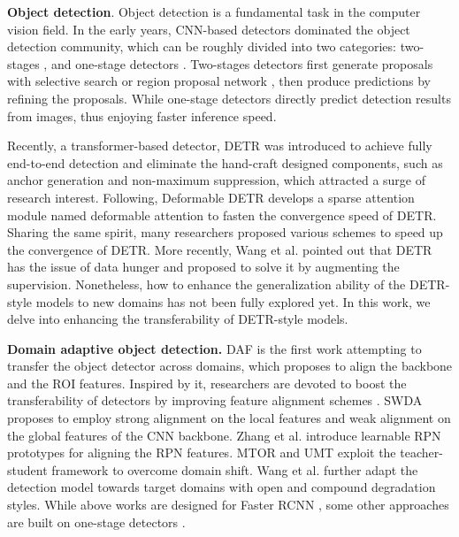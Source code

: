 \documentclass[sigconf]{acmart}
\begin{document}
\textbf{Object detection}.
Object detection is a fundamental task in the computer vision field. In the early years, CNN-based detectors dominated the object detection community, which can be roughly divided into two categories: two-stages \cite{faster-rcnn}, and one-stage detectors \cite{yolo,ssd}. Two-stages detectors first generate proposals with selective search \cite{fast_rcnn} or region proposal network \cite{faster-rcnn}, then produce predictions by refining the proposals. While one-stage detectors directly predict detection results from images, thus enjoying faster inference speed.

Recently, a transformer-based detector, DETR \cite{detr} was introduced to achieve fully end-to-end detection and eliminate the hand-craft designed components, such as anchor generation and non-maximum suppression, which attracted a surge of research interest. Following, Deformable DETR \cite{zhu2020deformable} develops a sparse attention module named deformable attention to fasten the convergence speed of DETR. Sharing the same spirit, many researchers \cite{up-detr,dn_detr,dino_detr,dab_detr} proposed various schemes to speed up the convergence of DETR. More recently, Wang et al. \cite{wang2022towards} pointed out that DETR has the issue of data hunger and proposed to solve it by augmenting the supervision. Nonetheless, how to enhance the generalization ability of the DETR-style models to new domains has not been fully explored yet. In this work, we delve into enhancing the transferability of DETR-style models.


\textbf{Domain adaptive object detection.}
DAF \cite{dafaster} is the first work attempting to transfer the object detector across domains, which proposes to align the backbone and the ROI features. Inspired by it, researchers are devoted to boost the transferability of detectors by improving feature alignment schemes \cite{strong-weak,scda,gpadet,xu2020exploring,maf,divmatch,proda,ViSGA,I3Net,RPA}. SWDA \cite{strong-weak} proposes to employ strong alignment on the local features and weak alignment on the global features of the CNN backbone. Zhang et al. \cite{RPA} introduce learnable RPN prototypes for aligning the RPN features. MTOR \cite{mtor} and UMT \cite{deng2021unbiased} exploit the teacher-student framework to overcome domain shift. Wang et al. \cite{wang2022robust} further adapt the detection model towards target domains with open and compound degradation styles. While above works are designed for Faster RCNN \cite{faster-rcnn}, some other approaches are built on one-stage detectors \cite{kim2019self,hsu2020every}. 
\end{document}
